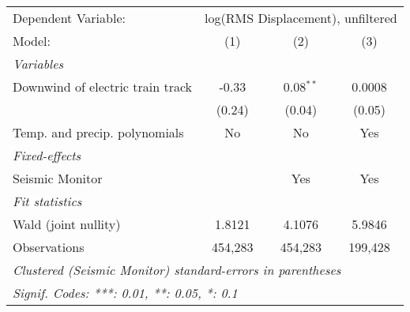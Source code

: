 
\begingroup
\centering
\begin{tabular}{lccc}
   \tabularnewline \midrule \midrule
   Dependent Variable: & \multicolumn{3}{c}{log(RMS Displacement), unfiltered}\\
   Model:                           & (1)     & (2)         & (3)\\  
   \midrule
   \emph{Variables}\\
   Downwind of electric train track & -0.33   & 0.08$^{**}$ & 0.0008\\   
                                    & (0.24)  & (0.04)      & (0.05)\\   
   Temp. and precip. polynomials    & No      & No          & Yes\\  
   \midrule
   \emph{Fixed-effects}\\
   Seismic Monitor                  &         & Yes         & Yes\\  
   \midrule
   \emph{Fit statistics}\\
   Wald (joint nullity)             & 1.8121  & 4.1076      & 5.9846\\  
   Observations                     & 454,283 & 454,283     & 199,428\\  
   \midrule \midrule
   \multicolumn{4}{l}{\emph{Clustered (Seismic Monitor) standard-errors in parentheses}}\\
   \multicolumn{4}{l}{\emph{Signif. Codes: ***: 0.01, **: 0.05, *: 0.1}}\\
\end{tabular}
\par\endgroup


